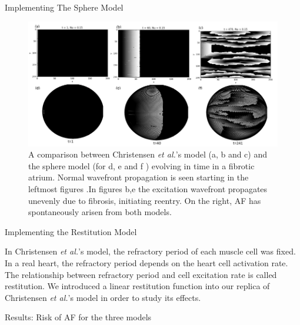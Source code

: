 \documentclass[final,hyperref={pdfpagelabels=false}]{beamer}
\begin{document}
\begin{frame}[t]
\begin{columns}[t]
\begin{column}{.465\textwidth}
\begin{block}{Implementing The Sphere Model}
\begin{figure}
\includegraphics[width=0.8\linewidth]{combchristensenspherefib}
\caption{A comparison between Christensen \emph{et al.}'s model  (a, b and c)  and the sphere model (for d, e and f ) evolving in time in a fibrotic atrium. Normal wavefront propagation is seen starting in the leftmost figures .In figures b,e the excitation wavefront propagates unevenly due to fibrosis, initiating reentry. On the right, AF has spontaneously arisen from both models.}
\end{figure}

\end{block}

\begin{block}{Implementing the Restitution Model}

In Christensen \emph{et al.}'s model, the refractory period of each muscle cell was fixed.
In a real heart, the refractory period depends on the heart cell activation rate. The relationship between refractory period and cell excitation rate is called restitution. We introduced a linear restitution function into our replica of Christensen \emph{et al.}'s model in order to study its effects.
\end{block}


\begin{block}{Results: Risk of AF for the three models}


\end{block}
\end{column}
\end{columns}
\end{frame}
\end{document}
